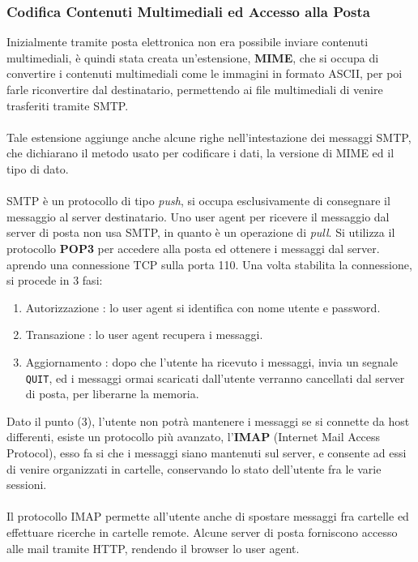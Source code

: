 \documentclass[12pt, letterpaper]{article}
\newcommand{\code}[1]{\colorbox{light-gray}{\texttt{#1}}}
\newcommand{\acc}{\\\hphantom{}\\}
\begin{document}
\subsubsection{Codifica Contenuti Multimediali ed Accesso alla Posta}
Inizialmente tramite posta elettronica non era possibile inviare contenuti multimediali, è quindi stata creata 
un'estensione, \textbf{MIME}, che si occupa di convertire i contenuti multimediali come le immagini in
formato ASCII, per poi farle riconvertire dal destinatario, permettendo ai file multimediali di venire 
trasferiti tramite SMTP.\acc 
Tale estensione aggiunge anche alcune righe nell'intestazione dei messaggi SMTP, che dichiarano il 
metodo usato per codificare i dati, la versione di MIME ed il tipo di dato.\acc 
SMTP è un protocollo di tipo \textit{push}, si occupa esclusivamente di consegnare il messaggio 
al server destinatario. Uno user agent per ricevere il messaggio dal server di posta non usa SMTP, in 
quanto è un operazione di \textit{pull}. Si utilizza il protocollo \textbf{POP3} per accedere alla posta 
ed ottenere i messaggi dal server. aprendo una connessione TCP sulla porta 110. Una volta stabilita la 
connessione, si procede in 3 fasi:\begin{enumerate}
    \item Autorizzazione : lo user agent si identifica con nome utente e password.
    \item Transazione : lo user agent recupera i messaggi.
    \item Aggiornamento : dopo che l'utente ha ricevuto i messaggi, invia un segnale \code{QUIT}, ed i 
    messaggi ormai scaricati dall'utente verranno cancellati dal server di posta, per liberarne 
    la memoria.
\end{enumerate}
Dato il punto (3), l'utente non potrà mantenere i messaggi se si connette da host differenti,
esiste un protocollo più avanzato, l'\textbf{IMAP} (Internet Mail Access Protocol), esso fa si che i messaggi 
siano mantenuti sul server, e consente ad essi di venire organizzati in cartelle, conservando lo stato 
dell'utente fra le varie sessioni.\acc Il protocollo IMAP permette all'utente anche di spostare messaggi 
fra cartelle ed effettuare ricerche in cartelle remote. Alcune server di posta forniscono accesso alle mail 
tramite HTTP, rendendo il browser lo user agent.
\end{document}

